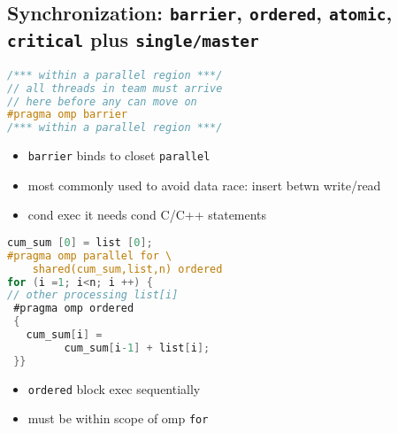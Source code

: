 \documentclass[8pt,a4paper,landscape]{extarticle}
\begin{document}
\pagestyle{empty}

\begin{multicols*}{3}
% 
% 
% 
% 

% 

% 
% 
% 
% 

% 


\subsection*{Synchronization: \texttt{barrier}, \texttt{ordered}, \texttt{atomic}, \texttt{critical} plus \texttt{single/master}}
\begin{minipage}{0.5\linewidth}
\begin{lstlisting}[language=C]
/*** within a parallel region ***/
// all threads in team must arrive
// here before any can move on
#pragma omp barrier
/*** within a parallel region ***/
\end{lstlisting}
\end{minipage}
\begin{minipage}{0.5\linewidth}
  \begin{itemize}
  \item \texttt{barrier} binds to closet \texttt{parallel}
  \item most commonly used to avoid data race: insert betwn write/read
  \item cond exec it needs cond C/C++ statements
\end{itemize}
\end{minipage}
\begin{minipage}{0.5\linewidth}
\begin{lstlisting}[language=C]
cum_sum [0] = list [0];
#pragma omp parallel for \
    shared(cum_sum,list,n) ordered
for (i =1; i<n; i ++) {
// other processing list[i]
 #pragma omp ordered
 {
   cum_sum[i] =
         cum_sum[i-1] + list[i];
 }}
\end{lstlisting}
\end{minipage}
\begin{minipage}{0.5\linewidth}
  \begin{itemize}
  \item \texttt{ordered} block exec sequentially
  \item must be within scope of omp \texttt{for}

\end{itemize}
\end{minipage}
\end{multicols*}
\end{document}
